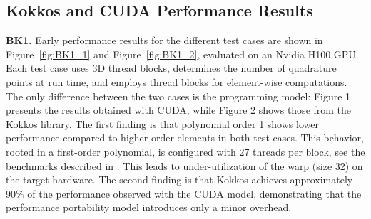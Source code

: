 \documentclass[a4paper,12pt]{article}
\begin{document}
\subsection{Kokkos and CUDA Performance Results}
{\bf BK1.} Early performance results for the different test cases are shown in Figure~\ref{fig:BK1_1} and Figure~\ref{fig:BK1_2}, evaluated on an Nvidia H100 GPU. Each test case uses 3D thread blocks, determines the number of quadrature points at run time, and employs thread blocks for element-wise computations. The only difference between the two cases is the programming model: Figure 1 presents the results obtained with CUDA, while Figure 2 shows those from the Kokkos library.
The first finding is that polynomial order 1 shows lower performance compared to higher-order elements in both test cases. This behavior, rooted in a first-order polynomial, is configured with 27 threads per block, see the benchmarks described in \cite{Fischer20scalability}. This leads to under-utilization of the warp (size 32) on the target hardware.
The second finding is that Kokkos achieves approximately 90\% of the performance observed with the CUDA model, demonstrating that the performance portability model introduces only a minor overhead.
\end{document}
